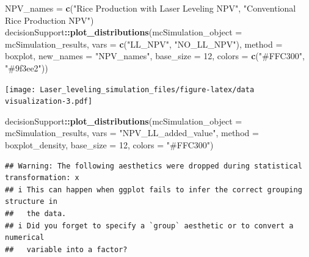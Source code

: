 \documentclass[
]{article}
\newenvironment{Shaded}{\begin{snugshade}}{\end{snugshade}}
\newcommand{\AttributeTok}[1]{\textcolor[rgb]{0.13,0.29,0.53}{#1}}
\newcommand{\DecValTok}[1]{\textcolor[rgb]{0.00,0.00,0.81}{#1}}
\newcommand{\FunctionTok}[1]{\textcolor[rgb]{0.13,0.29,0.53}{\textbf{#1}}}
\newcommand{\NormalTok}[1]{#1}
\newcommand{\OtherTok}[1]{\textcolor[rgb]{0.56,0.35,0.01}{#1}}
\newcommand{\SpecialCharTok}[1]{\textcolor[rgb]{0.81,0.36,0.00}{\textbf{#1}}}
\newcommand{\StringTok}[1]{\textcolor[rgb]{0.31,0.60,0.02}{#1}}
\begin{document}
\begin{Shaded}
\begin{Highlighting}[]
\NormalTok{NPV\_names }\OtherTok{=} \FunctionTok{c}\NormalTok{(}\StringTok{"Rice Production with Laser Leveling NPV"}\NormalTok{, }\StringTok{"Conventional Rice Production NPV"}\NormalTok{)}
\NormalTok{decisionSupport}\SpecialCharTok{::}\FunctionTok{plot\_distributions}\NormalTok{(}\AttributeTok{mcSimulation\_object =}\NormalTok{ mcSimulation\_results, }
                                    \AttributeTok{vars =} \FunctionTok{c}\NormalTok{(}\StringTok{"LL\_NPV"}\NormalTok{, }\StringTok{"NO\_LL\_NPV"}\NormalTok{),}
                                    \AttributeTok{method =} \StringTok{\textquotesingle{}boxplot\textquotesingle{}}\NormalTok{,}
                                    \AttributeTok{new\_names =} \StringTok{"NPV\_names"}\NormalTok{,}
                                    \AttributeTok{base\_size =} \DecValTok{12}\NormalTok{,}
                                    \AttributeTok{colors =} \FunctionTok{c}\NormalTok{(}\StringTok{"\#FFC300"}\NormalTok{, }\StringTok{"\#9f3ee2"}\NormalTok{))}
\end{Highlighting}
\end{Shaded}

\texttt{[image: Laser\_leveling\_simulation\_files/figure-latex/data visualization-3.pdf]}

\begin{Shaded}
\begin{Highlighting}[]
\NormalTok{decisionSupport}\SpecialCharTok{::}\FunctionTok{plot\_distributions}\NormalTok{(}\AttributeTok{mcSimulation\_object =}\NormalTok{ mcSimulation\_results, }
                                    \AttributeTok{vars =} \StringTok{"NPV\_LL\_added\_value"}\NormalTok{,}
                                    \AttributeTok{method =} \StringTok{\textquotesingle{}boxplot\_density\textquotesingle{}}\NormalTok{,}
                                    \AttributeTok{base\_size =} \DecValTok{12}\NormalTok{,}
                                    \AttributeTok{colors =} \StringTok{"\#FFC300"}\NormalTok{)}
\end{Highlighting}
\end{Shaded}

\begin{verbatim}
## Warning: The following aesthetics were dropped during statistical transformation: x
## i This can happen when ggplot fails to infer the correct grouping structure in
##   the data.
## i Did you forget to specify a `group` aesthetic or to convert a numerical
##   variable into a factor?
\end{verbatim}
\end{document}

